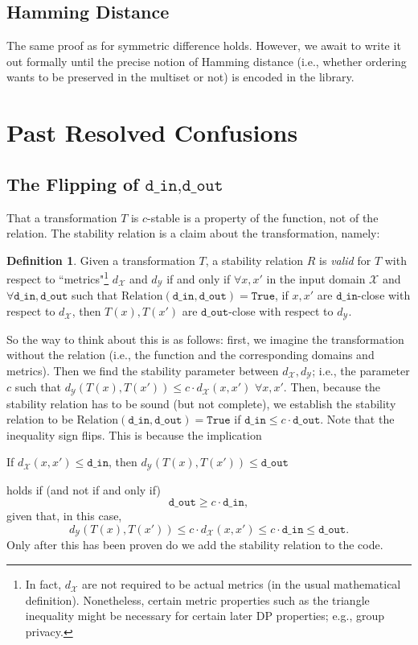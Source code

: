 \documentclass[11pt,a4paper]{article}
\theoremstyle{definition}
\newtheorem{definition}{Definition}
\newcommand{\din}{\texttt{d\_in}}
\newcommand{\dout}{\texttt{d\_out}}
\newcommand{\Relation}{\mathrm{Relation}}
\newcommand{\X}{\mathcal{X}}
\newcommand{\Y}{\mathcal{Y}}
\newcommand{\True}{\texttt{True}}
\begin{document}

\subsection{Hamming Distance}
The same proof as for symmetric difference holds. However, we await to write it out formally until the precise notion of Hamming distance (i.e., whether ordering wants to be preserved in the multiset or not) is encoded in the library.


\section{Past Resolved Confusions}
\subsection{The Flipping of $\din, \dout$}
That a transformation $T$ is $c$-stable is a property of the function, not of the relation. The stability relation is a claim about the transformation, namely:

\begin{definition}
Given a transformation $T$, a stability relation $R$ is \textit{valid} for $T$ with respect to ``metrics"\footnote{In fact, $d_{\X}$ are not required to be actual metrics (in the usual mathematical definition). Nonetheless, certain metric properties such as the triangle inequality might be necessary for certain later DP properties; e.g., group privacy.} $d_{\X}$ and $d_{\Y}$ if and only if $\forall x, x'$ in the input domain $\X$ and $\forall \din, \dout$ such that $\Relation(\din, \dout) = \True$, if $x, x'$ are $\din$-close with respect to $d_{\X}$, then $T(x), T(x')$ are $\dout$-close with respect to $d_{\Y}$.
\end{definition}

So the way to think about this is as follows: first, we imagine the transformation without the relation (i.e., the function and the corresponding domains and metrics). Then we find the stability parameter between $d_{\X}, d_{\Y}$; i.e., the parameter $c$ such that $d_{\Y}(T(x), T(x')) \leq c \cdot d_{\X}(x, x')$ $\forall x, x'$. Then, because the stability relation has to be sound (but not complete), we establish the stability relation to be $\Relation(\din, \dout) = \True$ if $\din \leq c \cdot \dout$. Note that the inequality sign flips. This is because the implication
\begin{center}
    If $d_{\X}(x, x') \leq \din$, then $d_{\Y}(T(x), T(x')) \leq \dout$
\end{center}
holds if (and not if and only if) 
\[
\dout \geq c \cdot \din,
\]
given that, in this case,
\[
d_{\Y}(T(x), T(x')) \leq c \cdot d_{\X}(x, x') \leq c \cdot \din \leq \dout.
\]
Only after this has been proven do we add the stability relation to the code.
\end{document}
